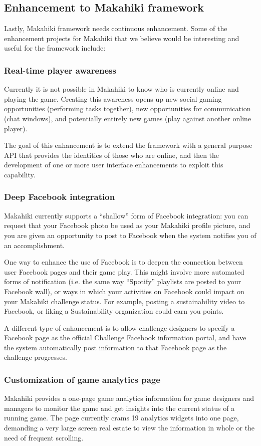 \subsection{Enhancement to Makahiki framework}
Lastly, Makahiki framework needs continuous enhancement. Some of the enhancement projects for Makahiki that we believe would be interesting and useful for the framework include:

\subsubsection{Real-time player awareness}
Currently it is not possible in Makahiki to know who is currently online and playing the game. Creating this awareness opens up new social gaming opportunities (performing tasks together), new opportunities for communication (chat windows), and potentially entirely new games (play against another online player). 

The goal of this enhancement is to extend the framework with a general purpose API that provides the identities of those who are online, and then the development of one or more user interface enhancements to exploit this capability.

\subsubsection{Deep Facebook integration}
Makahiki currently supports a ``shallow'' form of Facebook integration: you can request that your Facebook photo be used as your Makahiki profile picture, and you are given an opportunity to post to Facebook when the system notifies you of an accomplishment. 

One way to enhance the use of Facebook is to deepen the connection between user Facebook pages and their game play. This might involve more automated forms of notification (i.e. the same way ``Spotify'' playlists are posted to your Facebook wall), or ways in which your activities on Facebook could impact on your Makahiki challenge status. For example, posting a sustainability video to Facebook, or liking a Sustainability organization could earn you points. 

A different type of enhancement is to allow challenge designers to specify a Facebook page as the official Challenge Facebook information portal, and have the system automatically post information to that Facebook page as the challenge progresses.

\subsubsection{Customization of game analytics page}
\label{sec:future-game-manage}
Makahiki provides a one-page game analytics information for game designers and managers to monitor the game and get insights into the current status of a running game. The page currently crams 19 analytics widgets into one page, demanding a very large screen real estate to view the information in whole or the need of frequent scrolling. 

